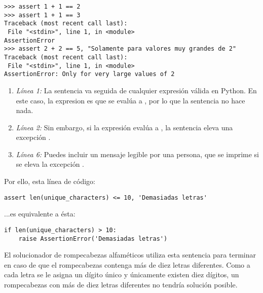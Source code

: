 \noindent\begin{minipage}{\textwidth}
\begin{lstlisting}[mathescape=True]
>>> assert 1 + 1 == 2
>>> assert 1 + 1 == 3
Traceback (most recent call last):
 File "<stdin>", line 1, in <module>
AssertionError 
>>> assert 2 + 2 == 5, "Solamente para valores muy grandes de 2"
Traceback (most recent call last):
 File "<stdin>", line 1, in <module> 
AssertionError: Only for very large values of 2
\end{lstlisting}
\end{minipage}

\begin{enumerate}

\item \emph{Línea 1:} La sentencia  va seguida de cualquier expresión válida en Python. En este caso, la expresion es  que se evalúa a , por lo que la sentencia  no hace nada.

\item \emph{Línea 2:} Sin embargo, si la expresión evalúa a , la sentencia  eleva una excepción .

\item \emph{Línea 6:} Puedes incluir un mensaje legible por una persona, que se imprime si se eleva la excepción .

\end{enumerate}
 
Por ello, esta línea de código:

\noindent\begin{minipage}{\textwidth}
\begin{lstlisting}[mathescape=True]
assert len(unique_characters) <= 10, 'Demasiadas letras'
\end{lstlisting}
\end{minipage}

...es equivalente a ésta:

\noindent\begin{minipage}{\textwidth}
\begin{lstlisting}[mathescape=True]
if len(unique_characters) > 10:
    raise AssertionError('Demasiadas letras')
\end{lstlisting}
\end{minipage}

El solucionador de rompecabezas alfaméticos utiliza esta sentencia  para terminar en caso de que el rompecabezas contenga más de diez letras diferentes. Como a cada letra se le asigna un dígito único y únicamente existen diez dígitos, un rompecabezas con más de diez letras diferentes no tendría solución posible.

